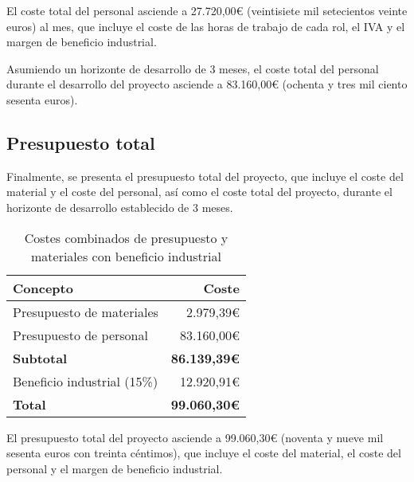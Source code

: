 El coste total del personal asciende a 27.720,00€ (veintisiete mil setecientos
veinte euros) al mes, que incluye el coste de las horas de trabajo de cada rol,
el IVA y el margen de beneficio industrial.

Asumiendo un horizonte de desarrollo de 3 meses, el coste total del personal
durante el desarrollo del proyecto asciende a 83.160,00€ (ochenta y tres mil
ciento sesenta euros).


\newpage{}
\subsection{Presupuesto total}\label{subsec:pres_total}
Finalmente, se presenta el presupuesto total del proyecto, que incluye el coste
del material y el coste del personal, así como el coste total del proyecto,
durante el horizonte de desarrollo establecido de 3 meses.

\begin{table}[H]
	\centering
	\small
	\begin{tabular}{|l|r|}
	\hline
	\textbf{Concepto} & \textbf{Coste} \\
	\hline
	Presupuesto de materiales & 2.979,39€ \\
	\hline
	Presupuesto de personal & 83.160,00€ \\
	\hline
	\textbf{Subtotal} & \textbf{86.139,39€} \\
	\hline
	\hline
	Beneficio industrial (15\%) & 12.920,91€ \\
	\hline
	\textbf{Total} & \textbf{99.060,30€} \\
	\hline
	\end{tabular}
	\caption{Costes combinados de presupuesto y materiales con beneficio industrial}
	\label{tab:costes_combinados}
\end{table}

El presupuesto total del proyecto asciende a 99.060,30€ (noventa y nueve mil
sesenta euros con treinta céntimos), que incluye el coste del material, el coste
del personal y el margen de beneficio industrial.
